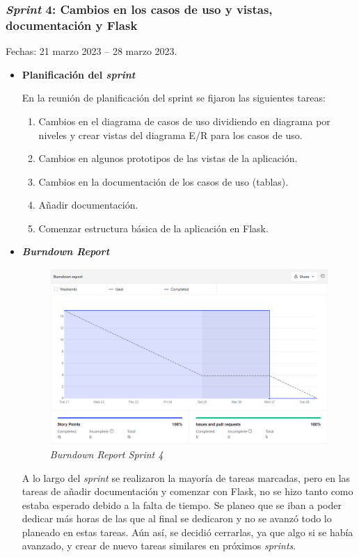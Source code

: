 \subsubsection{\textit{Sprint} 4: Cambios en los casos de uso y vistas, documentación y Flask}
Fechas: 21 marzo 2023 -- 28 marzo 2023.
\begin{itemize}
\item\textbf{Planificación del \textit{sprint}}

En la reunión de planificación del sprint se fijaron las siguientes tareas:
\begin{enumerate}
		\item Cambios en el diagrama de casos de uso dividiendo en diagrama por niveles y crear vistas del diagrama E/R para los casos de uso.
		\item Cambios en algunos prototipos de las vistas de la aplicación.
		\item Cambios en la documentación de los casos de uso (tablas).
		\item Añadir documentación.
		\item Comenzar estructura básica de la aplicación en Flask.
\end{enumerate}

\item\textbf{\textit{Burndown Report}}

\begin{figure}
	\centering
	\includegraphics[width=\textwidth]{../img/Anexos/Sprints/Sprint4.png}
	\caption{\textit{Burndown Report Sprint 4}}\label{ReportSprint4}
\end{figure}

A lo largo del \textit{sprint} se realizaron la mayoría de tareas marcadas, pero en las tareas de añadir documentación y comenzar con Flask, no se hizo tanto como estaba esperado debido a la falta de tiempo. 
Se planeo que se iban a poder dedicar más horas de las que al final se dedicaron y no se avanzó todo lo planeado en estas tareas. 
Aún así, se decidió cerrarlas, ya que algo si se había avanzado, y crear de nuevo tareas similares en próximos \textit{sprints}.


\end{itemize}
